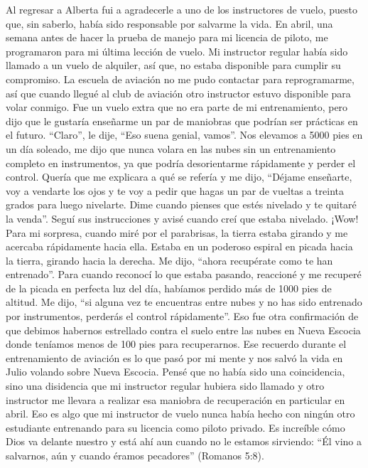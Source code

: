 \documentclass[twoside, 12pt]{book}
\begin{document}
Al regresar a Alberta fui a agradecerle a uno de los instructores de vuelo, puesto que, sin saberlo, había sido responsable por salvarme la vida. En abril, una semana antes de hacer la prueba de manejo para mi licencia de piloto, me programaron para mi última lección de vuelo. Mi instructor regular había sido llamado a un vuelo de alquiler, así que, no estaba disponible para cumplir su compromiso. La escuela de aviación no me pudo contactar para reprogramarme, así que cuando llegué al club de aviación otro instructor estuvo disponible para volar conmigo. Fue un vuelo extra que no era parte de mi entrenamiento, pero dijo que le gustaría enseñarme un par de maniobras que podrían ser prácticas en el futuro. “Claro”, le dije, “Eso suena genial, vamos”. Nos elevamos a 5000 pies en un día soleado, me dijo que nunca volara en las nubes sin un entrenamiento completo en instrumentos, ya que podría desorientarme rápidamente y perder el control. Quería que me explicara a qué se refería y me dijo, “Déjame enseñarte, voy a vendarte los ojos y te voy a pedir que hagas un par de vueltas a treinta grados para luego nivelarte. Dime cuando pienses que estés nivelado y te quitaré la venda”. Seguí sus instrucciones y avisé cuando creí que estaba nivelado. ¡Wow! Para mi sorpresa, cuando miré por el parabrisas, la tierra estaba girando y me acercaba rápidamente hacia ella. Estaba en un poderoso espiral en picada hacia la tierra, girando hacia la derecha. Me dijo, “ahora recupérate como te han entrenado”. Para cuando reconocí lo que estaba pasando, reaccioné y me recuperé de la picada en perfecta luz del día, habíamos perdido más de 1000 pies de altitud. Me dijo, “si alguna vez te encuentras entre nubes y no has sido entrenado por instrumentos, perderás el control rápidamente”. Eso fue otra confirmación de que debimos habernos estrellado contra el suelo entre las nubes en Nueva Escocia donde teníamos menos de 100 pies para recuperarnos. Ese recuerdo durante el entrenamiento de aviación es lo que pasó por mi mente y nos salvó la vida en Julio volando sobre Nueva Escocia. Pensé que no había sido una coincidencia, sino una disidencia que mi instructor regular hubiera sido llamado y otro instructor me llevara a realizar esa maniobra de recuperación en particular en abril. Eso es algo que mi instructor de vuelo nunca había hecho con ningún otro estudiante entrenando para su licencia como piloto privado. Es increíble cómo Dios va delante nuestro y está ahí aun cuando no le estamos sirviendo: “Él vino a salvarnos, aún y cuando éramos pecadores” (Romanos 5:8).\\
       	
\end{document}
